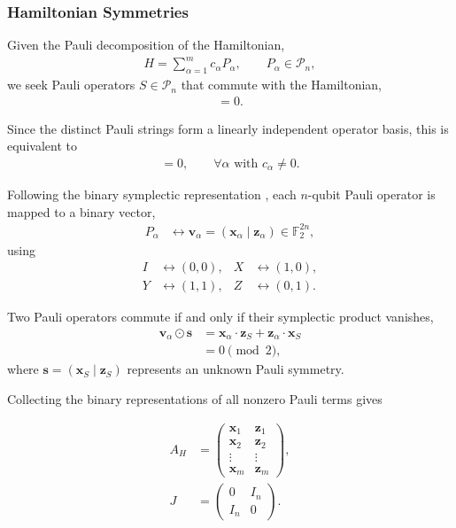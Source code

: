 \documentclass[amssymb,twocolumn,aps]{revtex4-2}
\begin{document}
\subsubsection{Hamiltonian Symmetries}
Given the Pauli decomposition of the Hamiltonian,
\begin{align*}
    H = \sum_{\alpha=1}^{m} c_\alpha P_\alpha,
    \qquad P_\alpha \in \mathcal{P}_n,
\end{align*}
we seek Pauli operators $S \in \mathcal{P}_n$
that commute with the Hamiltonian,
\begin{align*}
    [S,H] = 0.
\end{align*}

Since the distinct Pauli strings form a linearly
independent operator basis, this is equivalent to
\begin{align*}
    [S,P_\alpha] = 0,
    \qquad \forall \alpha \text{ with } c_\alpha \neq 0.
\end{align*}

Following the binary symplectic representation
\cite{Gottesman2026}, each $n$-qubit Pauli operator
is mapped to a binary vector,
\begin{align*}
    P_\alpha &\longleftrightarrow
    \mathbf{v}_\alpha =
    (\mathbf{x}_\alpha \mid \mathbf{z}_\alpha)
    \in \mathbb{F}_2^{2n},
\end{align*}
using
\begin{align*}
    I &\leftrightarrow (0,0),
    &X &\leftrightarrow (1,0),\\
    Y &\leftrightarrow (1,1),
    &Z &\leftrightarrow (0,1).
\end{align*}

Two Pauli operators commute if and only if their
symplectic product vanishes,
\begin{align*}
    \mathbf{v}_\alpha \odot \mathbf{s}
    &=
    \mathbf{x}_\alpha \cdot \mathbf{z}_S
    + \mathbf{z}_\alpha \cdot \mathbf{x}_S\\
    &= 0 \pmod 2,
\end{align*}
where $\mathbf{s}=(\mathbf{x}_S\mid\mathbf{z}_S)$
represents an unknown Pauli symmetry.

Collecting the binary representations of all
nonzero Pauli terms gives

\begin{align*}
    A_H &=
    \begin{pmatrix}
        \mathbf{x}_1 & \mathbf{z}_1 \\
        \mathbf{x}_2 & \mathbf{z}_2 \\
        \vdots & \vdots \\
        \mathbf{x}_m & \mathbf{z}_m
    \end{pmatrix}, \\[8pt]
    J &=
    \begin{pmatrix}
        0 & I_n \\
        I_n & 0
    \end{pmatrix}.
\end{align*}
\end{document}
